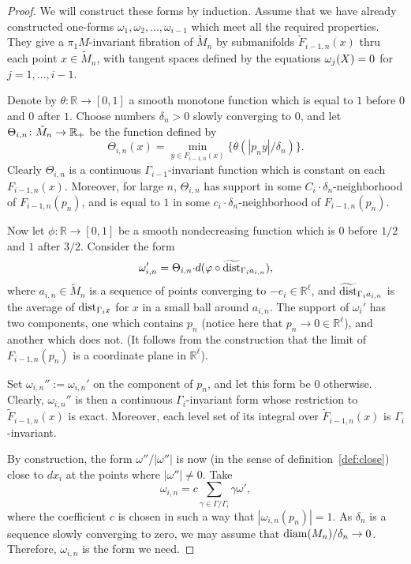\documentclass{amsart}
\begin{document}
\begin{proof}
We will construct these forms by induction.
Assume that we have already constructed one-forms
$\omega_1,\omega_2,\ldots, \omega_{i-1}$
which meet all the required properties.
They give a $\pi_1M$-invariant fibration of $\tilde M_n$ by submanifolds
$\tilde F_{i-1,n}(x)$ thru each point $x\in \tilde M_n$, with
tangent spaces defined by the equations $\omega_j(X)\z=0$ for $j=1,\ldots,i-1$.

Denote by $\theta\colon \mathbb{R}\to [0,1]$
a smooth monotone function
which is equal to $1$ before $0$ and $0$ after $1$.
Choose numbers $\delta_n>0$ slowly converging to $0$,
and let $\Theta_{i,n}\colon \tilde M_n\z\to \mathbb{R}_+$ be the function defined by
$$\Theta_{i,n}(x)
=\min_{y\in F_{i-1,n}(x)}\{\theta(|p_n y|/\delta_n)\}.$$
Clearly $\Theta_{i,n}$ is a continuous $\Gamma_{i-1}$-invariant function
which is constant on each $F_{i-1,n}(x)$.
Moreover, for large $n$,
$\Theta_{i,n}$ has support in  some $C_i{\cdot} \delta_n$-neighborhood
of $F_{i-1,n}(p_n)$, and is equal to $1$
in some $c_i{\cdot} \delta_n$-neighborhood of $F_{i-1,n}(p_n)$.

Now let $\phi\colon \mathbb{R}\to [0,1]$
be a smooth nondecreasing function
which is $0$ before $1/2$ and $1$ after $3/2$.
Consider the form
$$\omega_{i,n}'=\Theta_{i,n}{\cdot} d(\varphi\circ \widetilde{\operatorname{\rm dist}}_{\Gamma_{i}a_{i,n}}),$$
where $a_{i,n}\in \tilde M_n$ is a sequence of points
converging to $ -e_i\in \mathbb{R}^\ell$,
and $\widetilde{\operatorname{\rm dist}}_{\Gamma_{i}a_{i,n}}$ is the
average of $\operatorname{\rm dist}_{\Gamma_{i}x}$ for $x$ in a small ball around $a_{i,n}$.
The support of $\omega_i'$ has two components,
one which  contains $ p_n$ (notice here that $p_n\to 0\in \mathbb{R}^\ell$),
and another which does not.
(It follows from the construction
that  the limit of $F_{i-1,n}(p_n)$ is a coordinate plane  in $\mathbb{R}^\ell$).

Set $\omega_{i,n}'':=\omega_{i,n}'$ on the component of $ p_n$,
and let this form be $0$ otherwise.
Clearly, $\omega_{i,n}''$ is then a continuous $\Gamma_{i}$-invariant form
whose restriction to ${\tilde F_{i-1,n}(x)}$ is exact.
Moreover, each level set of its integral over
${\tilde F_{i-1,n}(x)}$ is $\Gamma_{i}$-invariant.

By construction, the form $\omega''/|\omega''|$ is now
 (in the sense of definition~\ref{def:close})
close to $dx_i$  at the points where
$|\omega''|\not=0$.
Take
$$\omega_{i,n}=c\sum_{\gamma\in \Gamma/\Gamma_i} \gamma\omega',$$
where the coefficient $c$ is chosen in such a way that  $|\omega_{i,n}(p_n)|=1$.
As $\delta_n$ is a sequence slowly converging to zero,
we may assume that $\operatorname{\rm diam} (M_n)/\delta_n\to 0$.
Therefore, $\omega_{i,n}$ is the form we need.
\end{proof}
\end{document}
